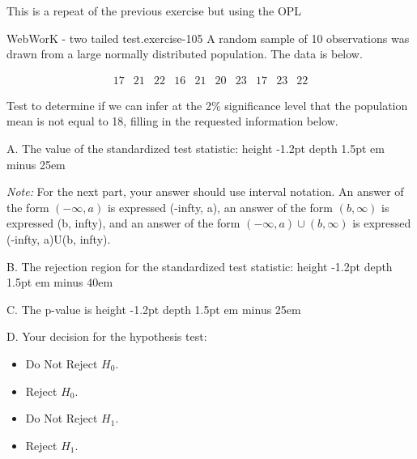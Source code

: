 \documentclass[10pt,]{book}
\newcommand{\fillin}[1]{\leavevmode\leaders\vrule height -1.2pt depth 1.5pt \hskip #1em minus #1em \null}
\numberwithin{equation}{section}
\newcommand{\amp}{&}
\begin{document}
%
\par
\hypertarget{p-1485}{}%
This is a repeat of the previous exercise but using the OPL \begin{inlineexercise}{WebWorK - two tailed test.}{exercise-105}%
\hypertarget{p-1486}{}%
A random sample of 10 observations was drawn from a large normally distributed population.  The data is below.%
\par
\hypertarget{p-1487}{}%
%
\begin{equation*}
\begin{array}{ccccccccccc} 
17 \amp  21 \amp  22 \amp  16 \amp  21 \amp  20 \amp  23 \amp  17 \amp  23 \amp  22 
\end{array}
\end{equation*}
%
\par
\hypertarget{p-1488}{}%
Test to determine if we can infer at the 2\% significance level that the population mean is not equal to 18, filling in the requested information below.%
\par
\hypertarget{p-1489}{}%
A. The value of the standardized test statistic:  \fillin{25}%
\par
\hypertarget{p-1490}{}%
\emph{Note:} For the next part, your answer should use interval notation.  An answer of the form \((-\infty, a)\) is expressed (-infty, a), an answer of the form \((b, \infty)\) is expressed (b, infty), and an answer of the form \((-\infty, a) \cup (b, \infty)\) is expressed (-infty, a)U(b, infty).%
\par
\hypertarget{p-1491}{}%
B. The rejection region for the standardized test statistic:  \fillin{40}%
\par
\hypertarget{p-1492}{}%
C. The p-value is  \fillin{25}%
\par
\hypertarget{p-1493}{}%
D. Your decision for the hypothesis test:%
\par
\hypertarget{p-1494}{}%
\par
\begin{itemize}[label=$\odot$,leftmargin=3em,]
\item{}\hypertarget{p-1495}{}%
Do Not Reject \(H_0\).%

\item{}\hypertarget{p-1496}{}%
Reject \(H_0\).%

\item{}\hypertarget{p-1497}{}%
Do Not Reject \(H_1\).%

\item{}\hypertarget{p-1498}{}%
Reject \(H_1\).%

\end{itemize}
%
\end{inlineexercise}
\end{document}
